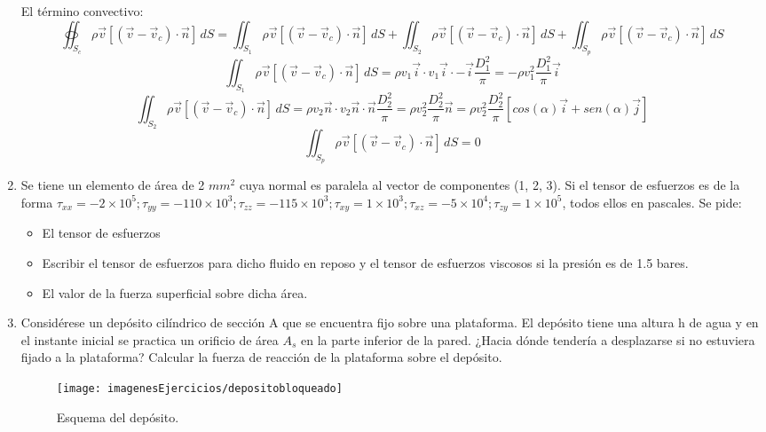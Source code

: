 \begin{enumerate}
{	El término convectivo:
	\[\oiint_{S_c}\rho\vec{v}\left[\left(\vec{v}-\vec{v}_c\right)\cdot\vec{n}\right]\,dS=
	\iint_{S_1}\rho\vec{v}\left[\left(\vec{v}-\vec{v}_c\right)\cdot\vec{n}\right]\,dS+
	\iint_{S_2}\rho\vec{v}\left[\left(\vec{v}-\vec{v}_c\right)\cdot\vec{n}\right]\,dS
	+\iint_{S_p}\rho\vec{v}\left[\left(\vec{v}-\vec{v}_c\right)\cdot\vec{n}\right]\,dS\]
	\[\iint_{S_1}\rho\vec{v}\left[\left(\vec{v}-\vec{v}_c\right)\cdot\vec{n}\right]\,dS=\rho v_1\vec{i}\cdot v_1\vec{i}\cdot-\vec{i}\frac{D^2_1}{\pi}=-\rho v^2_1\frac{D^2_1}{\pi}\vec{i}\]
	\[\iint_{S_2}\rho\vec{v}\left[\left(\vec{v}-\vec{v}_c\right)\cdot\vec{n}\right]\,dS=\rho v_2\vec{n}\cdot v_2\vec{n}\cdot\vec{n}\frac{D^2_2}{\pi}=\rho v^2_2\frac{D^2_2}{\pi}\vec{n}=\rho v^2_2\frac{D^2_2}{\pi}\left[cos(\alpha)\vec{i}+sen(\alpha)\vec{j}\right]\]
	\[\iint_{S_p}\rho\vec{v}\left[\left(\vec{v}-\vec{v}_c\right)\cdot\vec{n}\right]\,dS=0\]
		}
		
	
	
	
	
	\item Se tiene un elemento de área de 2 $mm^2$ cuya normal es paralela al vector de componentes
	(1, 2, 3). Si el tensor de esfuerzos es de la forma $\tau_{xx} = -2 \times 10^5; \tau_{yy} = -110 \times 10^ 3; \tau_{zz} =
	-115 \times 10^3; \tau_{xy} = 1\times10^3; \tau_{xz} = -5 \times 10^4;  \tau_{zy} = 1 \times 10^5$, todos ellos en pascales. Se pide:
	\begin{itemize}
		\item 	El tensor de esfuerzos
		\item 	Escribir el tensor de esfuerzos para dicho fluido en reposo y el tensor de esfuerzos
		viscosos si la presión es de 1.5 bares.
		\item El valor de la fuerza superficial sobre dicha área.
	\end{itemize}

	

	\item Considérese un depósito cilíndrico de sección A que se encuentra fijo sobre una plataforma. El depósito tiene una altura h de agua y en el instante inicial se practica
	un orificio de área $A_s$ en la parte inferior de la pared. ¿Hacia dónde tendería a desplazarse
	si no estuviera fijado a la plataforma? Calcular la fuerza de reacción de la plataforma sobre
	el depósito.
 \begin{figure}[H]
 	\centering
 	\texttt{[image: imagenesEjercicios/depositobloqueado]}
 	\caption{Esquema del depósito.}
 	\label{fig:depositobloqueado}
 \end{figure}
 
\end{enumerate}